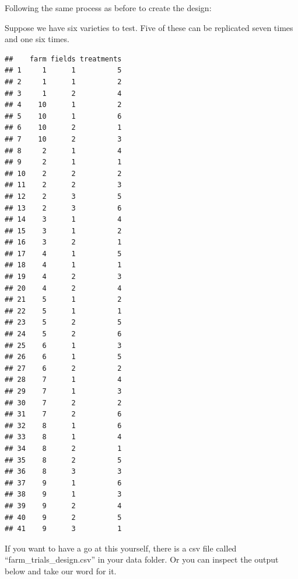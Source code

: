 \documentclass[
]{book}
\makeatletter
\newenvironment{Shaded}{\begin{snugshade}}{\end{snugshade}}
\newcommand{\AttributeTok}[1]{\textcolor[rgb]{0.77,0.63,0.00}{#1}}
\newcommand{\DecValTok}[1]{\textcolor[rgb]{0.00,0.00,0.81}{#1}}
\newcommand{\FunctionTok}[1]{\textcolor[rgb]{0.00,0.00,0.00}{#1}}
\newcommand{\NormalTok}[1]{#1}
\newcommand{\OtherTok}[1]{\textcolor[rgb]{0.56,0.35,0.01}{#1}}
\newcommand{\SpecialCharTok}[1]{\textcolor[rgb]{0.00,0.00,0.00}{#1}}
\newenvironment{kframe}{%
\medskip{}
\setlength{\fboxsep}{.8em}
 \def\at@end@of@kframe{}%
 \ifinner\ifhmode%
  \def\at@end@of@kframe{\end{minipage}}%
  \begin{minipage}{\columnwidth}%
 \fi\fi%
 \def\FrameCommand##1{\hskip\@totalleftmargin \hskip-\fboxsep
 \colorbox{shadecolor}{##1}\hskip-\fboxsep
     \hskip-\linewidth \hskip-\@totalleftmargin \hskip\columnwidth}%
 \MakeFramed {\advance\hsize-\width
   \@totalleftmargin\z@ \linewidth\hsize
   \@setminipage}}%
 {\par\unskip\endMakeFramed%
 \at@end@of@kframe}
\newenvironment{rmdblock}[1]
  {
  \begin{itemize}
  \renewcommand{\labelitemi}{
    \raisebox{-.7\height}[0pt][0pt]{
      {\setkeys{Gin}{width=3em,keepaspectratio}\texttt{[image: images/\#1]}}
    }
  }
  \setlength{\fboxsep}{1em}
  \begin{kframe}
  \item
  }
  {
  \end{kframe}
  \end{itemize}
  }
\newenvironment{rmdnote}
  {\begin{rmdblock}{note}}
  {\end{rmdblock}}
\makeatother
\begin{document}
Following the same process as before to create the design:

Suppose we have six varieties to test. Five of these can be replicated seven times and one six times.

\begin{Shaded}
\end{Shaded}

\begin{verbatim}
##    farm fields treatments
## 1     1      1          5
## 2     1      1          2
## 3     1      2          4
## 4    10      1          2
## 5    10      1          6
## 6    10      2          1
## 7    10      2          3
## 8     2      1          4
## 9     2      1          1
## 10    2      2          2
## 11    2      2          3
## 12    2      3          5
## 13    2      3          6
## 14    3      1          4
## 15    3      1          2
## 16    3      2          1
## 17    4      1          5
## 18    4      1          1
## 19    4      2          3
## 20    4      2          4
## 21    5      1          2
## 22    5      1          1
## 23    5      2          5
## 24    5      2          6
## 25    6      1          3
## 26    6      1          5
## 27    6      2          2
## 28    7      1          4
## 29    7      1          3
## 30    7      2          2
## 31    7      2          6
## 32    8      1          6
## 33    8      1          4
## 34    8      2          1
## 35    8      2          5
## 36    8      3          3
## 37    9      1          6
## 38    9      1          3
## 39    9      2          4
## 40    9      2          5
## 41    9      3          1
\end{verbatim}

\begin{rmdnote}
If you want to have a go at this yourself, there is a csv file called ``farm\_trials\_design.csv'' in your data folder. Or you can inspect the output below and take our word for it.
\end{rmdnote}
\end{document}
